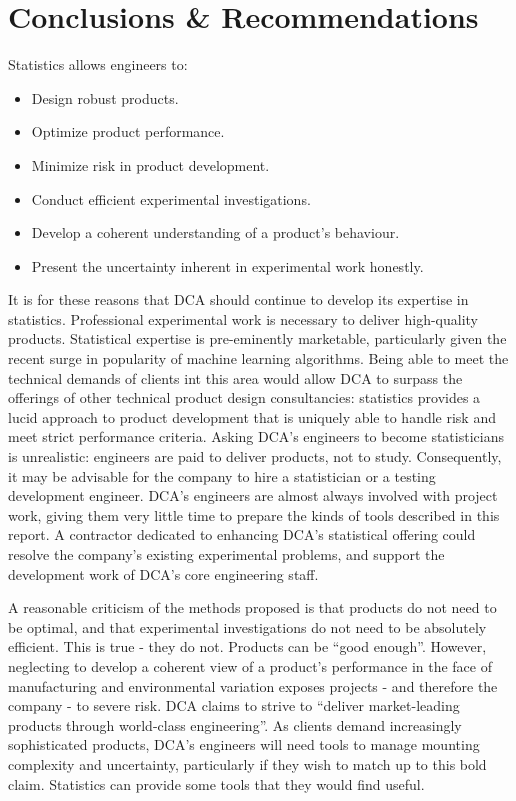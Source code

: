 \documentclass[11pt,a4paper,article]{memoir} %
\begin{document}
\chapter{Conclusions \& Recommendations}
\vspace{-28pt}
Statistics allows engineers to:
\begin{itemize}
\item Design robust products.
\item Optimize product performance.
\item Minimize risk in product development.
\item Conduct efficient experimental investigations.
\item Develop a coherent understanding of a product's behaviour.
\item Present the uncertainty inherent in experimental work honestly.
\end{itemize}
It is for these reasons that DCA should continue to develop its expertise in statistics. Professional experimental work is necessary to deliver high-quality products. Statistical expertise is pre-eminently marketable, particularly given the recent surge in popularity of machine learning algorithms. Being able to meet the technical demands of clients int this area would allow DCA to surpass the offerings of other technical product design consultancies: statistics provides a lucid approach to product development that is uniquely able to handle risk and meet strict performance criteria. Asking DCA's engineers to become statisticians is unrealistic: engineers are paid to deliver products, not to study. Consequently, it may be advisable for the company to hire a statistician or a testing development engineer. DCA's engineers are almost always involved with project work, giving them very little time to prepare the kinds of tools described in this report. A contractor dedicated to enhancing DCA's statistical offering could resolve the company's existing experimental problems, and support the development work of DCA's core engineering staff.

A reasonable criticism of the methods proposed is that products do not need to be optimal, and that experimental investigations do not need to be absolutely efficient. This is true - they do not. Products can be ``good enough''. However, neglecting to develop a coherent view of a product's performance in the face of manufacturing and environmental variation exposes projects - and therefore the company - to severe risk. DCA claims to strive to ``deliver market-leading products through world-class engineering''. As clients demand increasingly sophisticated products, DCA's engineers will need tools to manage mounting complexity and uncertainty, particularly if they wish to match up to this bold claim. Statistics can provide some tools that they would find useful.
\end{document}
